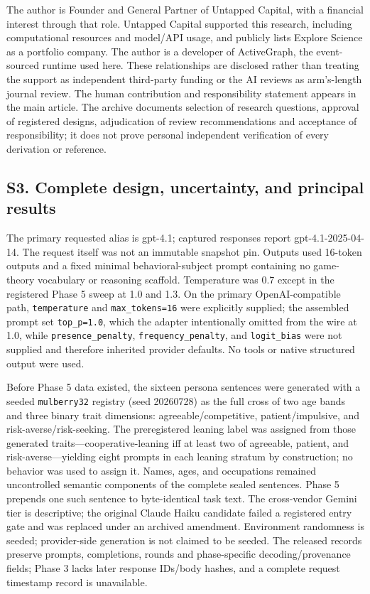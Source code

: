 \documentclass[11pt]{article}
\begin{document}
The author is Founder and General Partner of Untapped Capital, with a
financial interest through that role. Untapped Capital supported this
research, including computational resources and model/API usage, and
publicly lists Explore Science as a portfolio company. The author is a
developer of ActiveGraph, the event-sourced runtime used here. These
relationships are disclosed rather than treating the support as
independent third-party funding or the AI reviews as arm's-length
journal review. The human contribution and responsibility statement
appears in the main article. The archive documents selection of research
questions, approval of registered designs, adjudication of review
recommendations and acceptance of responsibility; it does not prove
personal independent verification of every derivation or reference.

\subsection{S3. Complete design, uncertainty, and principal
results}\label{s3.-complete-design-uncertainty-and-principal-results}

The primary requested alias is gpt-4.1; captured responses report
gpt-4.1-2025-04-14. The request itself was not an immutable snapshot
pin. Outputs used 16-token outputs and a fixed minimal
behavioral-subject prompt containing no game-theory vocabulary or
reasoning scaffold. Temperature was 0.7 except in the registered Phase 5
sweep at 1.0 and 1.3. On the primary OpenAI-compatible path,
\texttt{temperature} and \texttt{max\_tokens=16} were explicitly
supplied; the assembled prompt set \texttt{top\_p=1.0}, which the
adapter intentionally omitted from the wire at 1.0, while
\texttt{presence\_penalty}, \texttt{frequency\_penalty}, and
\texttt{logit\_bias} were not supplied and therefore inherited provider
defaults. No tools or native structured output were used.

Before Phase 5 data existed, the sixteen persona sentences were
generated with a seeded \texttt{mulberry32} registry (seed 20260728) as
the full cross of two age bands and three binary trait dimensions:
agreeable/competitive, patient/impulsive, and risk-averse/risk-seeking.
The preregistered leaning label was assigned from those generated
traits---cooperative-leaning iff at least two of agreeable, patient, and
risk-averse---yielding eight prompts in each leaning stratum by
construction; no behavior was used to assign it. Names, ages, and
occupations remained uncontrolled semantic components of the complete
sealed sentences. Phase 5 prepends one such sentence to byte-identical
task text. The cross-vendor Gemini tier is descriptive; the original
Claude Haiku candidate failed a registered entry gate and was replaced
under an archived amendment. Environment randomness is seeded;
provider-side generation is not claimed to be seeded. The released
records preserve prompts, completions, rounds and phase-specific
decoding/provenance fields; Phase 3 lacks later response IDs/body
hashes, and a complete request timestamp record is unavailable.
\end{document}
